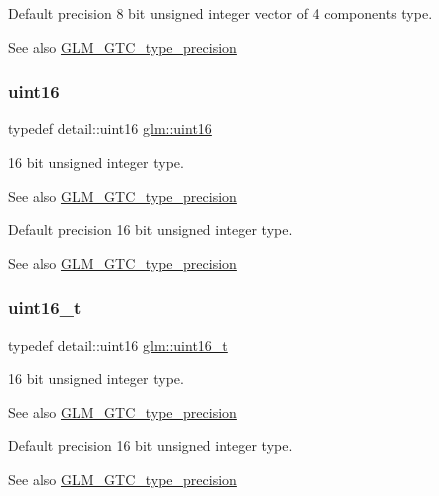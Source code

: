 Default precision 8 bit unsigned integer vector of 4 components type. \begin{DoxySeeAlso}{See also}
\hyperlink{group__gtc__type__precision}{G\+L\+M\+\_\+\+G\+T\+C\+\_\+type\+\_\+precision} 
\end{DoxySeeAlso}
\mbox{\label{group__gtc__type__precision_gad8c2939e1fdd8e5828b31d95c52255d5}} 
\subsubsection{\texorpdfstring{uint16}{uint16}}
{\footnotesize\ttfamily typedef detail\+::uint16 \hyperlink{group__gtc__type__precision_gad8c2939e1fdd8e5828b31d95c52255d5}{glm\+::uint16}}

16 bit unsigned integer type. \begin{DoxySeeAlso}{See also}
\hyperlink{group__gtc__type__precision}{G\+L\+M\+\_\+\+G\+T\+C\+\_\+type\+\_\+precision}
\end{DoxySeeAlso}
Default precision 16 bit unsigned integer type. \begin{DoxySeeAlso}{See also}
\hyperlink{group__gtc__type__precision}{G\+L\+M\+\_\+\+G\+T\+C\+\_\+type\+\_\+precision} 
\end{DoxySeeAlso}
\mbox{\label{group__gtc__type__precision_gac4eb4f43cae8129b00086dc234d3b8fc}} 
\subsubsection{\texorpdfstring{uint16\+\_\+t}{uint16\_t}}
{\footnotesize\ttfamily typedef detail\+::uint16 \hyperlink{group__gtc__type__precision_gac4eb4f43cae8129b00086dc234d3b8fc}{glm\+::uint16\+\_\+t}}

16 bit unsigned integer type. \begin{DoxySeeAlso}{See also}
\hyperlink{group__gtc__type__precision}{G\+L\+M\+\_\+\+G\+T\+C\+\_\+type\+\_\+precision}
\end{DoxySeeAlso}
Default precision 16 bit unsigned integer type. \begin{DoxySeeAlso}{See also}
\hyperlink{group__gtc__type__precision}{G\+L\+M\+\_\+\+G\+T\+C\+\_\+type\+\_\+precision} 
\end{DoxySeeAlso}
\mbox{\label{group__gtc__type__precision_ga202b6a53c105fcb7e531f9b443518451}} 

